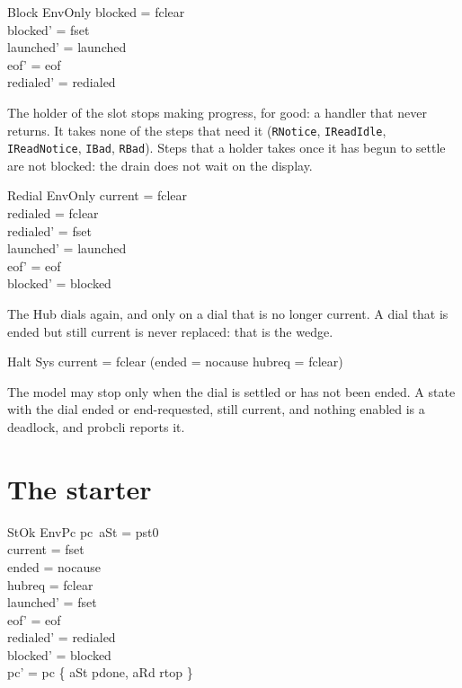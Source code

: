 \documentclass[a4paper,10pt,fleqn]{article}
\begin{document}
\begin{schema}{Block}
  EnvOnly
\where
  blocked = fclear \\
  blocked' = fset \\
  launched' = launched \\
  eof' = eof \\
  redialed' = redialed
\end{schema}

The holder of the slot stops making progress, for good: a handler that never
returns.  It takes none of the steps that need it (\texttt{RNotice},
\texttt{IReadIdle}, \texttt{IReadNotice}, \texttt{IBad}, \texttt{RBad}).  Steps
that a holder takes once it has begun to settle are not blocked: the drain does
not wait on the display.

\begin{schema}{Redial}
  EnvOnly
\where
  current = fclear \\
  redialed = fclear \\
  redialed' = fset \\
  launched' = launched \\
  eof' = eof \\
  blocked' = blocked
\end{schema}

The Hub dials again, and only on a dial that is no longer current.  A dial
that is ended but still current is never replaced: that is the wedge.

\begin{schema}{Halt}
  \Xi Sys
\where
  current = fclear \lor (ended = nocause \land hubreq = fclear)
\end{schema}

The model may stop only when the dial is settled or has not been ended.  A
state with the dial ended or end-requested, still current, and nothing enabled
is a deadlock, and probcli reports it.

\section{The starter}

\begin{schema}{StOk}
  EnvPc
\where
  pc~aSt = pst0 \\
  current = fset \\
  ended = nocause \\
  hubreq = fclear \\
  launched' = fset \\
  eof' = eof \\
  redialed' = redialed \\
  blocked' = blocked \\
  pc' = pc \oplus \{ aSt \mapsto pdone, aRd \mapsto rtop \}
\end{schema}
\end{document}
